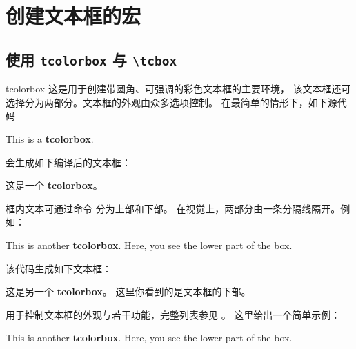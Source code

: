 \clearpage
\section{创建文本框的宏}%
%
\subsection{使用 \texttt{tcolorbox} 与 \texttt{\textbackslash tcbox}}\label{subsec:macros_using}
\begin{docEnvironment}{tcolorbox}{}
  这是用于创建带圆角、可强调的彩色文本框的主要环境，
  该文本框还可选择分为两部分。文本框的外观由众多选项控制。
  在最简单的情形下，如下源代码

\begin{dispListing}
\begin{tcolorbox}
This is a \textbf{tcolorbox}.
\end{tcolorbox}
\end{dispListing}

会生成如下编译后的文本框：
\begin{tcolorbox}
这是一个 \textbf{tcolorbox}。
\end{tcolorbox}

框内文本可通过命令  分为上部和下部。
在视觉上，两部分由一条分隔线隔开。例如：

\begin{dispListing}
\begin{tcolorbox}
This is another \textbf{tcolorbox}.
\tcblower
Here, you see the lower part of the box.
\end{tcolorbox}
\end{dispListing}

该代码生成如下文本框：
\begin{tcolorbox}
这是另一个 \textbf{tcolorbox}。
\tcblower
这里你看到的是文本框的下部。
\end{tcolorbox}

用于控制文本框的外观与若干功能，完整列表参见 。
这里给出一个简单示例：

\begin{dispExample}
\begin{tcolorbox}[colback=red!5!white,colframe=red!75!black,title=My nice heading]
This is another \textbf{tcolorbox}.
\tcblower
Here, you see the lower part of the box.
\end{tcolorbox}
\end{dispExample}
\end{docEnvironment}


